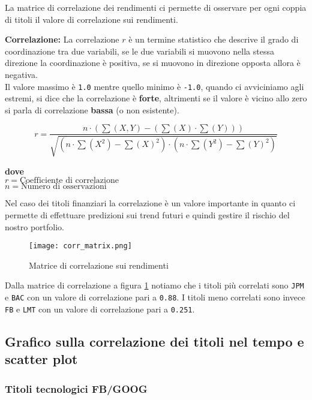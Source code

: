 La matrice di correlazione dei rendimenti ci permette di osservare per ogni coppia di titoli il valore di correlazione sui rendimenti.

\textbf{Correlazione:} La correlazione \(r\) è un termine statistico che descrive il grado di coordinazione tra due variabili, se le due variabili si muovono nella stessa direzione
la coordinazione è positiva, se si muovono in direzione opposta allora è negativa.\\
Il valore massimo è \verb|1.0| mentre quello minimo è \verb|-1.0|, quando ci avviciniamo agli estremi, si dice che la correlazione è \textbf{forte}, altrimenti se il valore è vicino allo zero si parla di correlazione \textbf{bassa} (o non esistente).

\begin{displaymath}
  r = \frac{n \cdot (\sum (X, Y) - (\sum (X) \cdot \sum (Y)))}
  {\sqrt{(n \cdot \sum(X^2) - \sum (X)^2) \cdot (n \cdot \sum (Y^2) - \sum (Y)^2)}}
\end{displaymath}

\textbf{dove}\\
\(r = \text{Coefficiente di correlazione}\)\\
\(n = \text{Numero di osservazioni}\)

Nel caso dei titoli finanziari la correlazione è un valore importante in quanto ci permette di effettuare predizioni sui trend futuri e quindi gestire il rischio del nostro
portfolio.

\begin{figure}[h]
  \centering
  \texttt{[image: corr\_matrix.png]}
  \caption{Matrice di correlazione sui rendimenti}
  \label{fig:corr_matrix}
\end{figure}

Dalla matrice di correlazione a figura \ref{fig:corr_matrix} notiamo che i titoli più correlati sono \verb|JPM| e \verb|BAC| con un valore di correlazione pari a
\verb|0.88|. I titoli meno correlati sono invece \verb|FB| e \verb|LMT| con un valore di correlazione pari a \verb|0.251|.

\subsection{Grafico sulla correlazione dei titoli nel tempo e scatter plot}

\subsubsection{Titoli tecnologici FB/GOOG}

